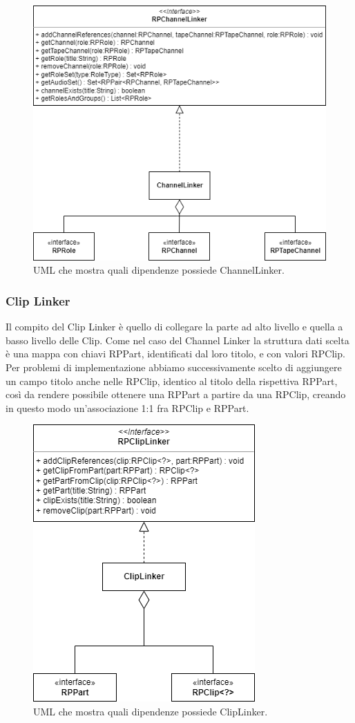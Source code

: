 \documentclass[a4paper,12pt]{report}
\begin{document}
\begin{figure}[H]
\centering{}
\includegraphics[width=\textwidth]{img/channelLinker.png}
\caption{UML che mostra quali dipendenze possiede ChannelLinker.}
\end{figure}

\subsubsection{Clip Linker}
Il compito del Clip Linker è quello di collegare la parte ad alto livello e quella a basso livello delle Clip. Come nel caso del Channel Linker la struttura dati scelta è una mappa con chiavi RPPart, identificati dal loro titolo, e con valori RPClip. Per problemi di implementazione abbiamo successivamente scelto di aggiungere un campo titolo anche nelle RPClip, identico al titolo della rispettiva RPPart, così da rendere possibile ottenere una RPPart a partire da una RPClip, creando in questo modo un'associazione 1:1 fra RPClip e RPPart.

\begin{figure}[H]
\centering{}
\includegraphics[scale=0.75]{img/clipLinker.png}
\caption{UML che mostra quali dipendenze possiede ClipLinker.}
\end{figure}
\end{document}
